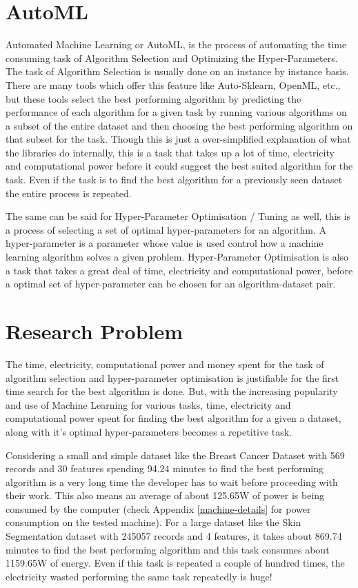 \section{AutoML}
Automated Machine Learning or AutoML, is the process of automating the time consuming task of Algorithm Selection and Optimizing the Hyper-Parameters. The task of Algorithm Selection is usually done on an instance by instance basis. There are many tools which offer this feature like Auto-Sklearn, OpenML, etc., but these tools select the best performing algorithm by predicting the performance of each algorithm for a given task by running various algorithms on a subset of the entire dataset and then choosing the best performing algorithm on that subset for the task. Though this is just a over-simplified explanation of what the libraries do internally, this is a task that takes up a lot of time, electricity and computational power before it could suggest the best suited algorithm for the task. Even if the task is to find the best algorithm for a previously seen dataset the entire process is repeated.

The same can be said for Hyper-Parameter Optimisation / Tuning as well, this is a process of selecting a set of optimal hyper-parameters for an algorithm. A hyper-parameter is a parameter whose value is used control how a machine learning algorithm solves a given problem. Hyper-Parameter Optimisation is also a task that takes a great deal of time, electricity and computational power, before a optimal set of hyper-parameter can be chosen for an algorithm-dataset pair.

\section{Research Problem}
The time, electricity, computational power and money spent for the task of algorithm selection and hyper-parameter optimisation is justifiable for the first time search for the best algorithm is done. But, with the increasing popularity and use of Machine Learning for various tasks, time, electricity and computational power spent for finding the best algorithm for a given a dataset, along with it's optimal hyper-parameters becomes a repetitive task. 

Considering a small and simple dataset like the Breast Cancer Dataset with 569 records and 30 features spending 94.24 minutes to find the best performing algorithm is a very long time the developer has to wait before proceeding with their work. This also means an average of about 125.65W of power is being consumed by the computer (check Appendix \ref{machine-details} for power consumption on the tested machine). For a large dataset like the Skin Segmentation dataset with 245057 records and 4 features, it takes about 869.74 minutes to find the best performing algorithm and this task consumes about 1159.65W of energy. Even if this task is repeated a couple of hundred times, the electricity wasted performing the same task repeatedly is huge!

